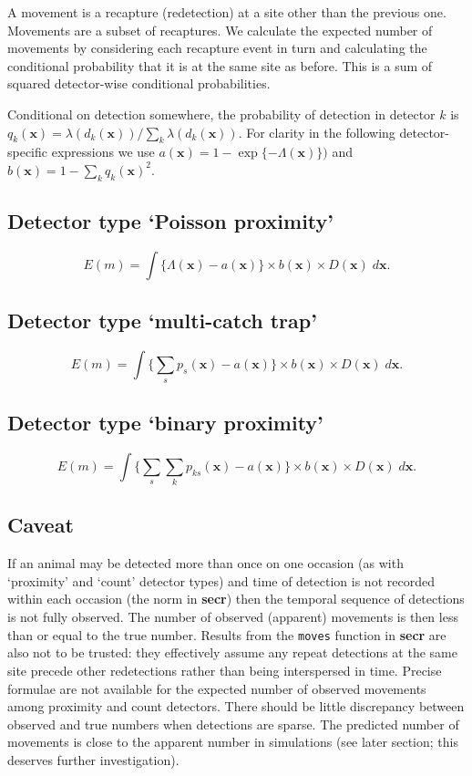 \documentclass[
]{book}
\begin{document}
A movement is a recapture (redetection) at a site other than the previous one. Movements are a subset of recaptures. We calculate the expected number of movements by considering each recapture event in turn and calculating the conditional probability that it is at the same site as before. This is a sum of squared detector-wise conditional probabilities.

Conditional on detection somewhere, the probability of detection in detector \(k\) is \(q_k(\mathbf{x}) = \lambda(d_k(\mathbf{x})) / \sum_k \lambda(d_k(\mathbf{x}))\). For clarity in the following detector-specific expressions we use \(a(\mathbf{x}) = 1 - \exp\{-\Lambda(\mathbf{x})\})\) and \(b(\mathbf{x}) = 1-\sum_k q_k(\mathbf{x})^2\).

\subsection{Detector type `Poisson proximity'}\label{detector-type-poisson-proximity-1}

\[E(m) = \int \{ \Lambda(\mathbf{x}) - a(\mathbf{x})\} \times b(\mathbf{x}) \times D(\mathbf{x}) \; d\mathbf{x}.\]

\subsection{Detector type `multi-catch trap'}\label{detector-type-multi-catch-trap-1}

\[E(m) = \int \{\sum_s p_s(\mathbf{x}) - a(\mathbf{x})\} \times b(\mathbf{x}) \times D(\mathbf{x}) \; d\mathbf{x}.\]

\subsection{Detector type `binary proximity'}\label{detector-type-binary-proximity-1}

\[E(m) = \int \{ \sum_s \sum_k p_{ks}(\mathbf{x})  - a(\mathbf{x}) \} \times b(\mathbf{x}) \times D(\mathbf{x}) \; d\mathbf{x}.\]

\subsection{Caveat}\label{caveat}

If an animal may be detected more than once on one occasion (as with `proximity' and `count' detector types) and time of detection is not recorded within each occasion (the norm in \textbf{secr}) then the temporal sequence of detections is not fully observed. The number of observed (apparent) movements is then less than or equal to the true number. Results from the \texttt{moves} function in \textbf{secr} are also not to be trusted: they effectively assume any repeat detections at the same site precede other redetections rather than being interspersed in time. Precise formulae are not available for the expected number of observed movements among proximity and count detectors. There should be little discrepancy between observed and true numbers when detections are sparse. The predicted number of movements is close to the apparent number in simulations (see later section; this deserves further investigation).
\end{document}

